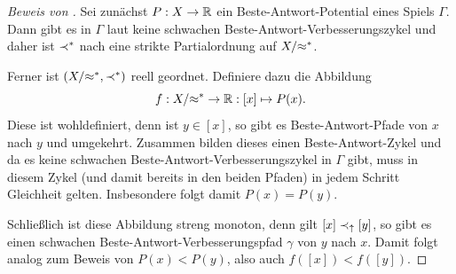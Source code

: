 \begin{proof}[Beweis von ]
	Sei zunächst $P: X \to \mathbb{R}$ ein Beste-Antwort-Potential eines Spiels $\Gamma$. Dann gibt es in $\Gamma$ laut  keine schwachen Beste-Antwort-Verbesserungszykel und daher ist $\prec^\ast$ nach  eine strikte Partialordnung auf $X/{\approx^\ast}$.
	
	Ferner ist $(X/{\approx^\ast}, \prec^\ast)$ reell geordnet. Definiere dazu die Abbildung 
		\[f: X/{\approx^\ast} \to \mathbb{R}: [x] \mapsto P(x).\]
	Diese ist wohldefiniert, denn ist $y \in [x]$, so gibt es Beste-Antwort-Pfade von $x$ nach $y$ und umgekehrt. Zusammen bilden dieses einen Beste-Antwort-Zykel und da es keine schwachen Beste-Antwort-Verbesserungszykel in $\Gamma$ gibt, muss in diesem Zykel (und damit bereits in den beiden Pfaden) in jedem Schritt Gleichheit gelten. Insbesondere folgt damit $P(x) = P(y)$.
		
	Schließlich ist diese Abbildung streng monoton, denn gilt $[x] \prec_\uparrow [y]$, so gibt es einen schwachen Beste-Antwort-Verbesserungspfad $\gamma$ von $y$ nach $x$. Damit folgt analog zum Beweis von  $P(x) < P(y)$, also auch $f([x]) < f([y])$.
	

\end{proof}
